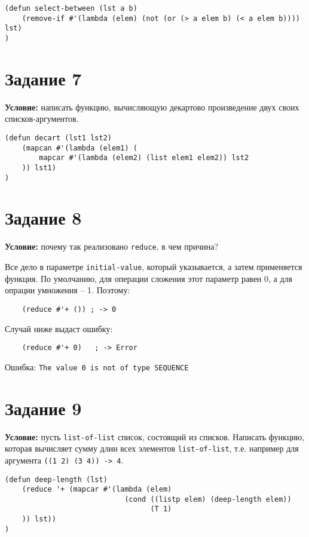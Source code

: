 \begin{lstlisting}
(defun select-between (lst a b)
    (remove-if #'(lambda (elem) (not (or (> a elem b) (< a elem b)))) lst)
)
\end{lstlisting}


\section{Задание 7}

\textbf{Условие:} написать функцию, вычисляющую декартово произведение двух своих списков-аргументов.

\begin{lstlisting}
(defun decart (lst1 lst2)
    (mapcan #'(lambda (elem1) (
        mapcar #'(lambda (elem2) (list elem1 elem2)) lst2
    )) lst1)
)
\end{lstlisting}


\section{Задание 8}

\textbf{Условие:} почему так реализовано \texttt{reduce}, в чем причина?

Все дело в параметре \texttt{initial-value}, который указывается, а затем применяется функция. По умолчанию, для операции сложения этот параметр равен 0, а для опрации умножения -- 1. 
Поэтому:
\begin{verbatim}
    (reduce #'+ ()) ; -> 0
\end{verbatim}

Случай ниже выдаст ошибку:
\begin{verbatim}
    (reduce #'+ 0)   ; -> Error
\end{verbatim}

Ошибка:
\texttt{The value 0 is not of type SEQUENCE}


\section{Задание 9}

\textbf{Условие:} пусть \texttt{list-of-list} список, состоящий из списков. Написать функцию, которая вычисляет сумму длин всех элементов \texttt{list-of-list}, т.е. например для аргумента \texttt{((1 2) (3 4)) -> 4}.


\begin{lstlisting}
(defun deep-length (lst)
    (reduce '+ (mapcar #'(lambda (elem) 
                            (cond ((listp elem) (deep-length elem))
                                  (T 1)
    )) lst))
)
\end{lstlisting}
